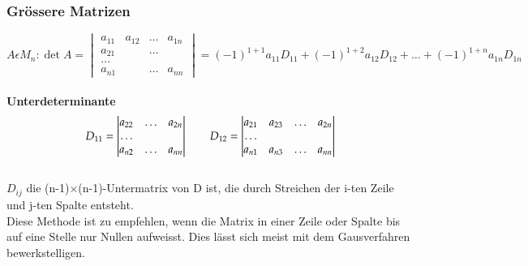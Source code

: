 \subsubsection{Grössere Matrizen}
$$A\epsilon M_n: \det A =    
\begin{vmatrix}
a_{11} & a_{12}& \ldots & a_{1n}\\
a_{21}& &\ldots & \\
\ldots \\
a_{n1} & & \ldots & a_{nn}    			
\end{vmatrix}=
(-1)^{1+1}a_{11}D_{11} + (-1)^{1+2}a_{12}D_{12}+ \ldots +
(-1)^{1+n}a_{1n}D_{1n}$$
\\
\textbf{Unterdeterminante}
$$D_{11}=
\begin{vmatrix}
a_{22} & \ldots & a_{2n}\\
\ldots\\
a_{n2}& \ldots & a_{nn}
\end{vmatrix} 	\\
\qquad
D_{12}=
\begin{vmatrix}
a_{21} & a_{23}& \ldots & a_{2n}\\
\ldots\\
a_{n1}& a_{n3}&\ldots & a_{nn}
\end{vmatrix}$$\\
$D_{ij}$ die (n-1)$ \times $(n-1)-Untermatrix von D ist, die durch Streichen der
i-ten Zeile und j-ten Spalte entsteht.\\
Diese Methode ist zu empfehlen, wenn die Matrix in einer Zeile oder Spalte
bis auf eine Stelle nur Nullen aufweisst.
Dies lässt sich meist mit dem Gausverfahren bewerkstelligen.

